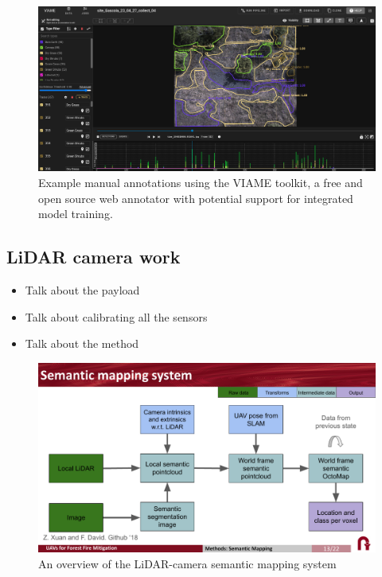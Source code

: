 \begin{figure}
    \centering
    \includegraphics[width=\textwidth]{figs/methods/semantic_mapping/viame_example.png}
    \caption{Example manual annotations using the VIAME toolkit, a free and open source web annotator with potential support for integrated model training.}
    \label{fig:methods:manual-annotations}
\end{figure}

\subsection{LiDAR camera work}
\begin{itemize}
    \item Talk about the payload
    \item Talk about calibrating all the sensors
    \item Talk about the method
\end{itemize}

\begin{figure}
    \centering
    \includegraphics[width=\textwidth]{figs/methods/semantic_mapping/semantic_mapping_overview.pdf}
    \caption{An overview of the LiDAR-camera semantic mapping system}
    \label{fig:lidar-camera-semantic-mapping}
\end{figure}

